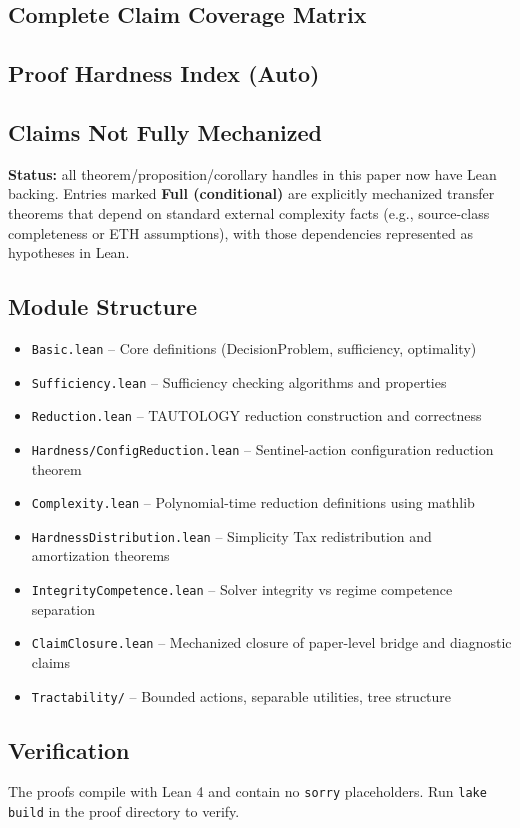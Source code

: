 \subsection{Complete Claim Coverage Matrix}

\subsection{Proof Hardness Index (Auto)}

\subsection{Claims Not Fully Mechanized}

\textbf{Status:} all theorem/proposition/corollary handles in this paper now have Lean backing.
Entries marked \textbf{Full (conditional)} are explicitly mechanized transfer theorems that depend on standard external complexity facts (e.g., source-class completeness or ETH assumptions), with those dependencies represented as hypotheses in Lean.

\subsection{Module Structure}

\begin{itemize}
\item \texttt{Basic.lean} -- Core definitions (DecisionProblem, sufficiency, optimality)
\item \texttt{Sufficiency.lean} -- Sufficiency checking algorithms and properties
\item \texttt{Reduction.lean} -- TAUTOLOGY reduction construction and correctness
\item \texttt{Hardness/ConfigReduction.lean} -- Sentinel-action configuration reduction theorem
\item \texttt{Complexity.lean} -- Polynomial-time reduction definitions using mathlib
\item \texttt{HardnessDistribution.lean} -- Simplicity Tax redistribution and amortization theorems
\item \texttt{IntegrityCompetence.lean} -- Solver integrity vs regime competence separation
\item \texttt{ClaimClosure.lean} -- Mechanized closure of paper-level bridge and diagnostic claims
\item \texttt{Tractability/} -- Bounded actions, separable utilities, tree structure
\end{itemize}

\subsection{Verification}

The proofs compile with Lean 4 and contain no \texttt{sorry} placeholders. Run \texttt{lake build} in the proof directory to verify.
